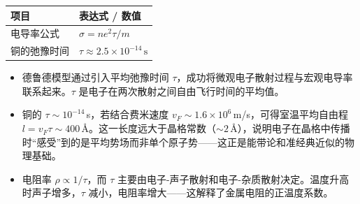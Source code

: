 \begin{formulabox}[答案汇总]
\begin{center}
\begin{tabular}{ll}
\toprule
\textbf{项目} & \textbf{表达式 / 数值} \\
\midrule
电导率公式 & $\sigma=ne^2\tau/m$ \\
铜的弛豫时间 & $\tau\approx2.5\times10^{-14}\,\text{s}$ \\
\bottomrule
\end{tabular}
\end{center}
\end{formulabox}

\begin{insightbox}[物理图像]
\begin{itemize}
    \item 德鲁德模型通过引入平均弛豫时间 $\tau$，成功将微观电子散射过程与宏观电导率联系起来。$\tau$ 是电子在两次散射之间自由飞行时间的平均值。
    \item 铜的 $\tau\sim10^{-14}\,$s，若结合费米速度 $v_F\sim1.6\times10^6\,$m/s，可得室温平均自由程 $l=v_F\tau\sim400\,$\AA。这一长度远大于晶格常数（$\sim2\,$\AA），说明电子在晶格中传播时``感受''到的是平均势场而非单个原子势——这正是能带论和准经典近似的物理基础。
    \item 电阻率 $\rho\propto1/\tau$，而 $\tau$ 主要由电子-声子散射和电子-杂质散射决定。温度升高时声子增多，$\tau$ 减小，电阻率增大——这解释了金属电阻的正温度系数。
\end{itemize}
\end{insightbox}
